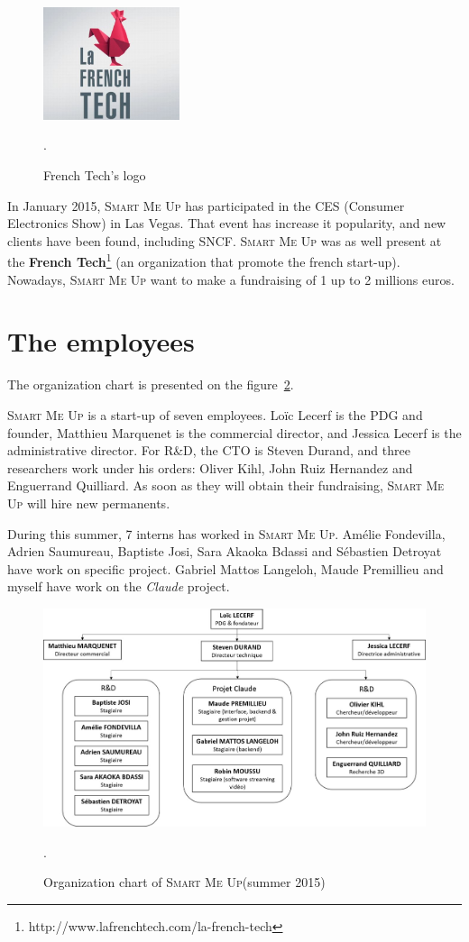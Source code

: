 \documentclass[a4paper,11pt]{custom}
\newcommand{\smu}{\textsc{Smart Me Up}\xspace}
\newcommand{\claude}{\textit{Claude}\xspace}
\begin{document}
\begin{figure}
  \centering
  \includegraphics[width=4cm]{french-tech.jpg}
  \label{fig:frenchtech}
  \caption{French Tech's logo}.
\end{figure}

In January 2015, \smu{} has participated in the CES (Consumer Electronics Show) in
Las Vegas. That event has increase it popularity, and new clients have been
found, including SNCF. \smu{} was as well present at the \textbf{French
Tech}\footnote{http://www.lafrenchtech.com/la-french-tech}
(an organization that promote the french start-up). Nowadays, \smu{} want to
make a fundraising of 1 up to 2 millions euros.

\section{The employees}

The organization chart is presented on the figure~\ref{fig:organigramme}.

\smu is a start-up of seven employees. Loïc Lecerf is the PDG and founder,
Matthieu Marquenet is the commercial director, and Jessica Lecerf is the
administrative director. For R\&D, the CTO is Steven Durand, and three
researchers work under his orders: Oliver Kihl, John Ruiz Hernandez and
Enguerrand Quilliard. As soon as they will obtain their fundraising, \smu{}
will hire new permanents.

During this summer, 7 interns has worked in \smu. Amélie Fondevilla, Adrien
Saumureau, Baptiste Josi, Sara Akaoka Bdassi and Sébastien Detroyat have work on
specific project. Gabriel Mattos Langeloh, Maude Premillieu and myself have work
on the \claude{} project.

\begin{figure}
  \centering
  \def\svgwidth{\columnwidth}
  \includegraphics[width=\textwidth]{organigramme.jpg}
  \label{fig:organigramme}
  \caption{Organization chart of \smu (summer 2015)}.
\end{figure}
\end{document}
